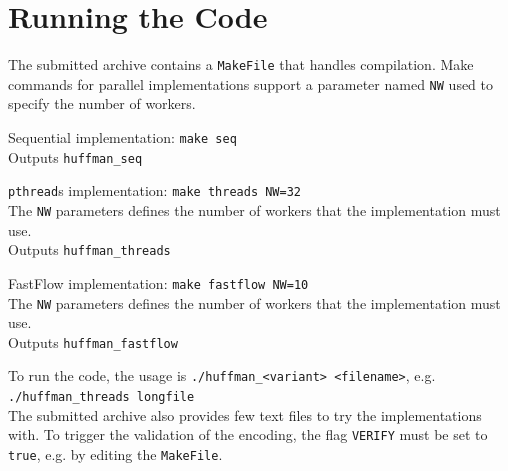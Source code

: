 \documentclass[10pt]{article}
\begin{document}
\section{Running the Code}
The submitted archive contains a \texttt{MakeFile} that handles compilation. Make commands for parallel implementations support a parameter named \texttt{NW} used to specify the number of workers.
\begin{list}{}{}
	\item Sequential implementation: \texttt{make seq}\\
	Outputs \texttt{huffman\_seq}
	\item \texttt{pthread}s implementation: \texttt{make threads NW=32}\\
	The \texttt{NW} parameters defines the number of workers that the implementation must use.\\
	Outputs \texttt{huffman\_threads}
	\item FastFlow implementation: \texttt{make fastflow NW=10}\\
	The \texttt{NW} parameters defines the number of workers that the implementation must use.\\
	Outputs \texttt{huffman\_fastflow}
\end{list}
To run the code, the usage is \texttt{./huffman\_<variant> <filename>}, e.g. \texttt{./huffman\_threads longfile}\\
The submitted archive also provides few text files to try the implementations with. To trigger the validation of the encoding, the flag \texttt{VERIFY} must be set to \texttt{true}, e.g. by editing the \texttt{MakeFile}.
\end{document}
